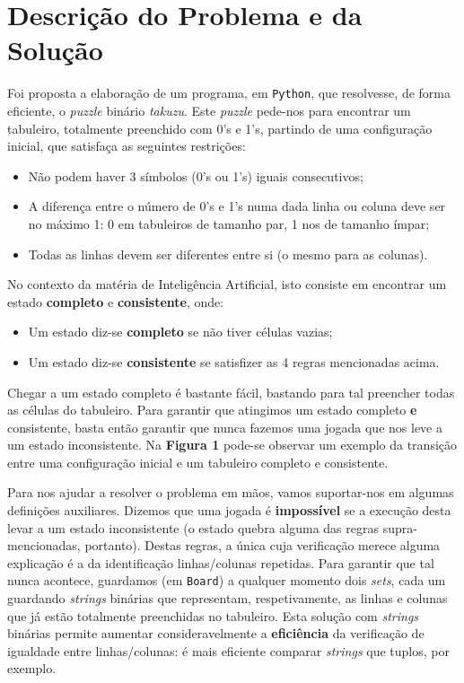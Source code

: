 \documentclass[12pt,a4paper]{article}
\begin{document}
\section*{Descrição do Problema e da Solução}

Foi proposta a elaboração de um programa, em \texttt{Python}, que resolvesse, de forma eficiente, o \textit{puzzle} binário \textit{takuzu}.
Este \textit{puzzle} pede-nos para encontrar um tabuleiro, totalmente preenchido com 0's e 1's, partindo de uma configuração inicial, que satisfaça as seguintes restrições:
\begin{itemize}
  \item Não podem haver 3 símbolos (0's ou 1's) iguais consecutivos;
  \item A diferença entre o número de 0's e 1's numa dada linha ou coluna deve ser no máximo 1: 0 em tabuleiros de tamanho par, 1 nos de tamanho ímpar;
  \item Todas as linhas devem ser diferentes entre si (o mesmo para as colunas).
\end{itemize}

No contexto da matéria de Inteligência Artificial, isto consiste em encontrar um estado \textbf{completo} e \textbf{consistente}, onde:
\begin{itemize}
  \item Um estado diz-se \textbf{completo} se não tiver células vazias;
  \item Um estado diz-se \textbf{consistente} se satisfizer as 4 regras mencionadas acima.
\end{itemize}

Chegar a um estado completo é bastante fácil, bastando para tal preencher todas as células do tabuleiro.
Para garantir que atingimos um estado completo \textbf{e} consistente, basta então garantir que nunca fazemos uma jogada que nos leve a um estado inconsistente.
Na \textbf{Figura 1} pode-se observar um exemplo da transição entre uma configuração inicial e um tabuleiro completo e consistente.

Para nos ajudar a resolver o problema em mãos, vamos suportar-nos em algumas definições auxiliares.
Dizemos que uma jogada é \textbf{impossível} se a execução desta levar a um estado inconsistente (o estado quebra alguma das regras supra-mencionadas, portanto).
Destas regras, a única cuja verificação merece alguma explicação é a da identificação linhas/colunas repetidas.
Para garantir que tal nunca acontece, guardamos (em \texttt{Board}) a qualquer momento dois \textit{sets}, cada um guardando \textit{strings} binárias que representam, respetivamente, as linhas e colunas que já estão totalmente preenchidas no tabuleiro.
Esta solução com \textit{strings} binárias permite aumentar consideravelmente a \textbf{eficiência} da verificação de igualdade entre linhas/colunas: é mais eficiente comparar \textit{strings} que tuplos, por exemplo.
\end{document}
